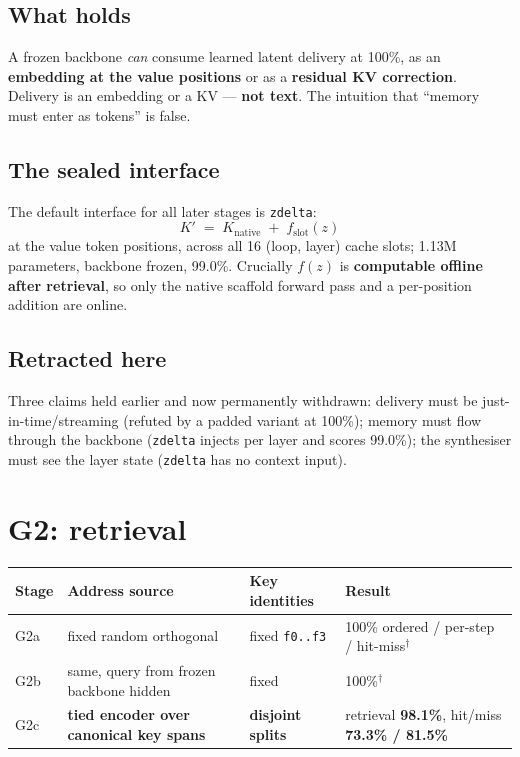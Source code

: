 \documentclass[11pt, a4paper]{article}
\begin{document}
\subsection{What holds}

A frozen backbone \emph{can} consume learned latent delivery at 100\%, as an
\textbf{embedding at the value positions} or as a \textbf{residual KV correction}.
Delivery is an embedding or a KV --- \textbf{not text}. The intuition that ``memory must
enter as tokens'' is false.

\subsection{The sealed interface}

The default interface for all later stages is \verb|zdelta|:
\[
K' \;=\; K_{\mathrm{native}} \;+\; f_{\mathrm{slot}}(z)
\]
at the value token positions, across all 16 (loop, layer) cache slots; 1.13M parameters,
backbone frozen, 99.0\%. Crucially $f(z)$ is \textbf{computable offline after retrieval},
so only the native scaffold forward pass and a per-position addition are online.

\subsection{Retracted here}

Three claims held earlier and now permanently withdrawn: delivery must be
just-in-time/streaming (refuted by a padded variant at 100\%); memory must flow through
the backbone (\verb|zdelta| injects per layer and scores 99.0\%); the synthesiser must
see the layer state (\verb|zdelta| has no context input).

\section{G2: retrieval}

\begin{table}[h]
\centering\small
\begin{tabular}{llll}
\toprule
Stage & Address source & Key identities & Result \\
\midrule
G2a & fixed random orthogonal & fixed \verb|f0..f3| & 100\% ordered / per-step / hit-miss$^\dagger$ \\
G2b & same, query from frozen backbone hidden & fixed & 100\%$^\dagger$ \\
G2c & \textbf{tied encoder over canonical key spans} & \textbf{disjoint splits}
  & retrieval \textbf{98.1\%}, hit/miss \textbf{73.3\% / 81.5\%} \\
\bottomrule
\end{tabular}
\end{table}
\end{document}
